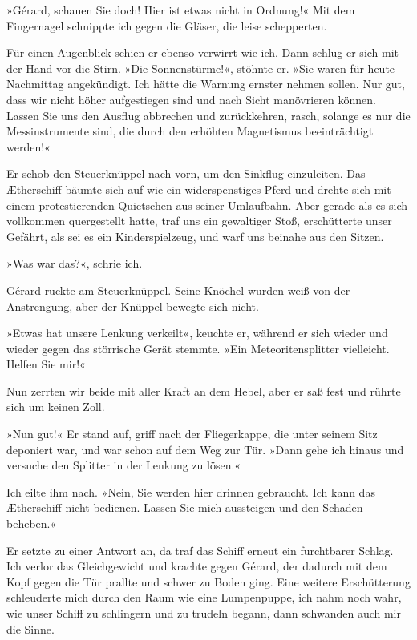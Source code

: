 »Gérard, schauen Sie doch! Hier ist etwas nicht in Ordnung!« Mit
dem Fingernagel schnippte ich gegen die Gläser, die leise
schepperten.

Für einen Augenblick schien er ebenso verwirrt wie ich. Dann schlug
er sich mit der Hand vor die Stirn. »Die Sonnenstürme!«, stöhnte
er. »Sie waren für heute Nachmittag angekündigt. Ich hätte die
Warnung ernster nehmen sollen. Nur gut, dass wir nicht höher
aufgestiegen sind und nach Sicht manövrieren können. Lassen Sie uns
den Ausflug abbrechen und zurückkehren, rasch, solange es nur die
Messinstrumente sind, die durch den erhöhten Magnetismus
beeinträchtigt werden!«

Er schob den Steuerknüppel nach vorn, um den Sinkflug einzuleiten.
Das Ætherschiff bäumte sich auf wie ein widerspenstiges Pferd und
drehte sich mit einem protestierenden Quietschen aus seiner
Umlaufbahn. Aber gerade als es sich vollkommen quergestellt hatte,
traf uns ein gewaltiger Stoß, erschütterte unser Gefährt, als sei
es ein Kinderspielzeug, und warf uns beinahe aus den Sitzen.

»Was war das?«, schrie ich.

Gérard ruckte am Steuerknüppel. Seine Knöchel wurden weiß von der
Anstrengung, aber der Knüppel bewegte sich nicht.

»Etwas hat unsere Lenkung verkeilt«, keuchte er, während er sich
wieder und wieder gegen das störrische Gerät stemmte. »Ein
Meteoritensplitter vielleicht. Helfen Sie mir!«

Nun zerrten wir beide mit aller Kraft an dem Hebel, aber er saß
fest und rührte sich um keinen Zoll.

»Nun gut!« Er stand auf, griff nach der Fliegerkappe, die unter
seinem Sitz deponiert war, und war schon auf dem Weg zur Tür. »Dann
gehe ich hinaus und versuche den Splitter in der Lenkung zu
lösen.«

Ich eilte ihm nach. »Nein, Sie werden hier drinnen gebraucht. Ich
kann das Ætherschiff nicht bedienen. Lassen Sie mich aussteigen und
den Schaden beheben.«

Er setzte zu einer Antwort an, da traf das Schiff erneut ein
furchtbarer Schlag. Ich verlor das Gleichgewicht und krachte gegen
Gérard, der dadurch mit dem Kopf gegen die Tür prallte und schwer
zu Boden ging. Eine weitere Erschütterung schleuderte mich durch
den Raum wie eine Lumpenpuppe, ich nahm noch wahr, wie unser Schiff
zu schlingern und zu trudeln begann, dann schwanden auch mir die
Sinne.

\bigpar

